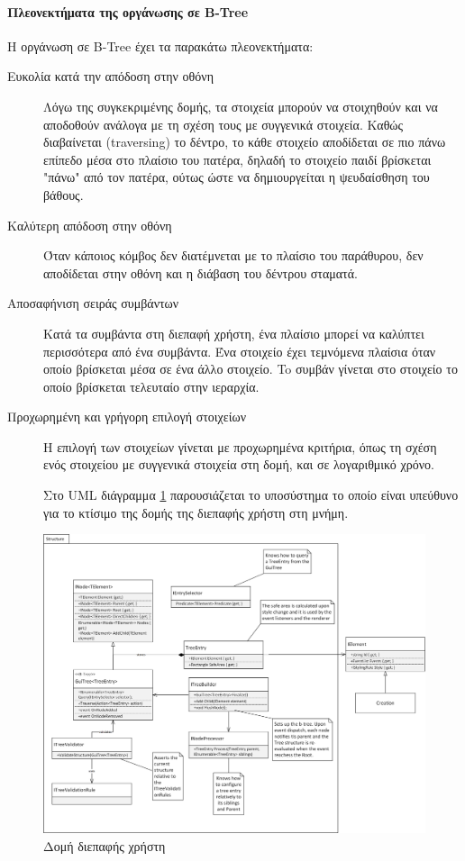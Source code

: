 \paragraph{Πλεονεκτήματα της οργάνωσης σε B-Tree}
Η οργάνωση σε \gls{B-Tree} έχει τα παρακάτω πλεονεκτήματα:
\begin{description}
	\item [Ευκολία κατά την απόδοση στην οθόνη] Λόγω της συγκεκριμένης δομής, τα στοιχεία μπορούν να στοιχηθούν και να αποδοθούν ανάλογα με τη σχέση τους με συγγενικά στοιχεία. Καθώς διαβαίνεται (traversing) το δέντρο, το κάθε στοιχείο αποδίδεται σε πιο πάνω επίπεδο μέσα στο πλαίσιο του πατέρα, δηλαδή το στοιχείο παιδί βρίσκεται "πάνω" από τον πατέρα, ούτως ώστε να δημιουργείται η ψευδαίσθηση του βάθους.
	\item [Καλύτερη απόδοση στην οθόνη] Όταν κάποιος κόμβος δεν διατέμνεται με το πλαίσιο του παράθυρου, δεν αποδίδεται στην οθόνη και η διάβαση του δέντρου σταματά.
	\item [Αποσαφήνιση σειράς συμβάντων] Κατά τα συμβάντα στη διεπαφή χρήστη, ένα πλαίσιο μπορεί να καλύπτει περισσότερα από ένα συμβάντα. Ένα στοιχείο έχει τεμνόμενα πλαίσια όταν οποίο βρίσκεται μέσα σε ένα άλλο στοιχείο. To συμβάν γίνεται στο στοιχείο το οποίο βρίσκεται τελευταίο στην ιεραρχία.
	\item [Προχωρημένη και γρήγορη επιλογή στοιχείων] Η επιλογή των στοιχείων γίνεται με προχωρημένα κριτήρια, όπως τη σχέση ενός στοιχείου με συγγενικά στοιχεία στη δομή, και σε λογαριθμικό χρόνο.
	
Στο \gls{UML} διάγραμμα \ref{fig:ui_structure} παρουσιάζεται το υποσύστημα το οποίο είναι υπεύθυνο για το κτίσιμο της δομής της διεπαφής χρήστη στη μνήμη.
\end{description}
	\begin{figure}[h!]
		\centering
		\includegraphics[width=165mm]{Images/gui_structure}
		\caption{Δομή διεπαφής χρήστη}
		\label{fig:ui_structure}
	\end{figure}

